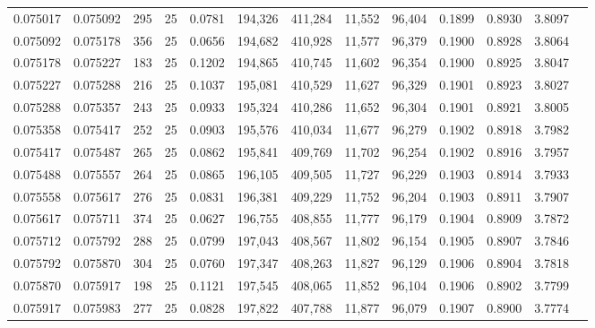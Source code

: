 \begin{tabular}{rrrrrrrrrrrrr}
0.075017 & 0.075092 &   295 &  25 &                                     0.0781 & 194,326 & 411,284 &  11,552 &  96,404 & 0.1899 & 0.8930 & 3.8097 \\
0.075092 & 0.075178 &   356 &  25 &                                     0.0656 & 194,682 & 410,928 &  11,577 &  96,379 & 0.1900 & 0.8928 & 3.8064 \\
0.075178 & 0.075227 &   183 &  25 &                                     0.1202 & 194,865 & 410,745 &  11,602 &  96,354 & 0.1900 & 0.8925 & 3.8047 \\
0.075227 & 0.075288 &   216 &  25 &                                     0.1037 & 195,081 & 410,529 &  11,627 &  96,329 & 0.1901 & 0.8923 & 3.8027 \\
0.075288 & 0.075357 &   243 &  25 &                                     0.0933 & 195,324 & 410,286 &  11,652 &  96,304 & 0.1901 & 0.8921 & 3.8005 \\
0.075358 & 0.075417 &   252 &  25 &                                     0.0903 & 195,576 & 410,034 &  11,677 &  96,279 & 0.1902 & 0.8918 & 3.7982 \\
0.075417 & 0.075487 &   265 &  25 &                                     0.0862 & 195,841 & 409,769 &  11,702 &  96,254 & 0.1902 & 0.8916 & 3.7957 \\
0.075488 & 0.075557 &   264 &  25 &                                     0.0865 & 196,105 & 409,505 &  11,727 &  96,229 & 0.1903 & 0.8914 & 3.7933 \\
0.075558 & 0.075617 &   276 &  25 &                                     0.0831 & 196,381 & 409,229 &  11,752 &  96,204 & 0.1903 & 0.8911 & 3.7907 \\
0.075617 & 0.075711 &   374 &  25 &                                     0.0627 & 196,755 & 408,855 &  11,777 &  96,179 & 0.1904 & 0.8909 & 3.7872 \\
0.075712 & 0.075792 &   288 &  25 &                                     0.0799 & 197,043 & 408,567 &  11,802 &  96,154 & 0.1905 & 0.8907 & 3.7846 \\
0.075792 & 0.075870 &   304 &  25 &                                     0.0760 & 197,347 & 408,263 &  11,827 &  96,129 & 0.1906 & 0.8904 & 3.7818 \\
0.075870 & 0.075917 &   198 &  25 &                                     0.1121 & 197,545 & 408,065 &  11,852 &  96,104 & 0.1906 & 0.8902 & 3.7799 \\
0.075917 & 0.075983 &   277 &  25 &                                     0.0828 & 197,822 & 407,788 &  11,877 &  96,079 & 0.1907 & 0.8900 & 3.7774 \\

\end{tabular}
